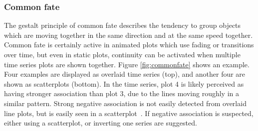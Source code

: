 \documentclass[letterpaper]{ar-1col}\usepackage[]{graphicx}\usepackage[]{color}
\begin{document}
\subsubsection{Common fate}
The gestalt principle of common fate describes the tendency to group objects which are moving together in the same direction and at the same speed together. Common fate is certainly active in animated plots which use fading or transitions over time, but even in static plots, continuity can be activated when multiple time series plots are shown together. Figure \ref{fig:commonfate} shows an example. Four examples are displayed as overlaid time series (top), and another four are shown as scatterplots (bottom). In the time series, plot 4 is likely perceived as having stronger association than plot 3, due to the lines moving roughly in a similar pattern. Strong negative association is not easily detected from overlaid line plots, but is easily seen in a scatterplot~\citep{tomasetti}. If negative association is suspected, either using a scatterplot, or inverting one series are suggested.
\end{document}
